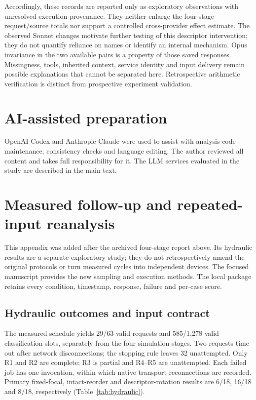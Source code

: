 \documentclass[11pt,a4paper]{article}
\begin{document}
Accordingly, these records are reported only as exploratory observations with unresolved execution provenance. They neither enlarge the four-stage request/source totals nor support a controlled cross-provider effect estimate. The observed Sonnet changes motivate further testing of this descriptor intervention; they do not quantify reliance on names or identify an internal mechanism. Opus invariance in the two available pairs is a property of those saved responses. Missingness, tools, inherited context, service identity and input delivery remain possible explanations that cannot be separated here. Retrospective arithmetic verification is distinct from prospective experiment validation.


\FloatBarrier
\section*{AI-assisted preparation}
OpenAI Codex and Anthropic Claude were used to assist with analysis-code maintenance, consistency checks and language editing. The author reviewed all content and takes full responsibility for it. The LLM services evaluated in the study are described in the main text.
\section{Measured follow-up and repeated-input reanalysis}
This appendix was added after the archived four-stage report above. Its hydraulic results are a separate exploratory study; they do not retrospectively amend the original protocols or turn measured cycles into independent devices. The focused manuscript provides the new sampling and execution methods. The local package retains every condition, timestamp, response, failure and per-case score.

\subsection{Hydraulic outcomes and input contract}
The measured schedule yields 29/63 valid requests and 585/1,278 valid classification slots, separately from the four simulation stages. Two requests time out after network disconnections; the stopping rule leaves 32 unattempted. Only R1 and R2 are complete; R3 is partial and R4--R5 are unattempted. Each failed job has one invocation, within which native transport reconnections are recorded. Primary fixed-focal, intact-reorder and descriptor-rotation results are 6/18, 16/18 and 8/18, respectively (Table~\ref{tab:hydraulic}). 
\end{document}
